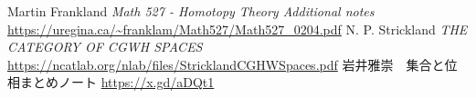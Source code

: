 \documentclass[dvipdfmx,a4paper,11pt]{article}
\theoremstyle{definition}
\begin{document}
\begin{comment}
\end{proof}

\bibitem[alg]{alg}
alg-d 全ての概念はKan拡張である
\url{https://alg-d.com/math/kan_extension/}
\bibitem[Asg]{Asg}
Dagur Asgeirsson
\textit{The Foundations of Condensed Mathematics}
\url{https://dagur.sites.ku.dk/files/2022/01/condensed-foundations.pdf}
\bibitem[Bar22]{Bar22}
Michael Barz \textit{Condensed Mathematics}
\url{https://www.dropbox.com/scl/fi/xm2bs6jgtv9oaqir2slbt/condensed-final.pdf?rlkey=r1x82m3a135rfeec86jrjj79k&e=1&dl=0}
\bibitem[Fra]{Fra}
Martin Frankland \textit{Math 527 - Homotopy Theory
Additional notes}
\url{https://uregina.ca/~franklam/Math527/Math527_0204.pdf}
\bibitem[Land]{Land}
Marks Land
\textit{CONDENSED MATHEMATICS}
\url{https://www.markus-land.de/teaching/}
\bibitem[Lep]{Lep}
Florian Leptien
\textit{Master thesis Condensed Mathematics}
\bibitem[Sta]{Sta}
Stacks Project \textit{Site and sheaves}
\url{https://stacks.math.columbia.edu/download/sites.pdf}
\bibitem[Stum]{Stum}
Bernard Le Stum
\textit{An introduction to condensed mathematics}
\url{https://perso.univ-rennes1.fr/bernard.le-stum/bernard.le-stum/Enseignement_files/CondensedBook.pdf}
\bibitem[Str]{Str}
N. P. Strickland
\textit{THE CATEGORY OF CGWH SPACES}
\url{https://ncatlab.org/nlab/files/StricklandCGHWSpaces.pdf}
\bibitem[Sch19]{Sch19}
Peter Scholze
\textit{Lectures on Condensed Mathematics}
\url{https://www.math.uni-bonn.de/people/scholze/Condensed.pdf}
\bibitem[SchClau]{SchClau}
Peter Scholze, Dustin Clausen
\textit{Masterclass in Condensed Mathematics}
\url{https://www.math.ku.dk/english/calendar/events/condensed-mathematics/}
\bibitem[Sha1]{Sha1}
Shane Kelly \textit{Notes on the [HTT] proof of sheafification}
\url{https://www.ms.u-tokyo.ac.jp/~kelly/Course2023-24DAG/Sheafification.pdf}
\bibitem[Sha2]{Sha2}
Shane Kelly
\textit{Fast track guide to cardinals for use with Lurie’s Higher Topos Theory}
\url{https://www.ms.u-tokyo.ac.jp/~kelly/pdfs/cardinalsFastTrack.pdf}
\bibitem[Iwa22]{Iwa22}
岩井雅崇　集合と位相まとめノート
\url{https://x.gd/aDQt1}
\bibitem[田中]{Tana}
田中尚夫 公理的集合論　培風館
\bibitem[マックレーン]{Mac}
S. マックレーン 圏論の基礎 丸善出版

\end{comment}


\begin{thebibliography}{n}
Martin Frankland \textit{Math 527 - Homotopy Theory
Additional notes}
\url{https://uregina.ca/~franklam/Math527/Math527_0204.pdf}
N. P. Strickland
\textit{THE CATEGORY OF CGWH SPACES}
\url{https://ncatlab.org/nlab/files/StricklandCGHWSpaces.pdf}
岩井雅崇　集合と位相まとめノート
\url{https://x.gd/aDQt1}
\end{thebibliography}
 
\end{document}

